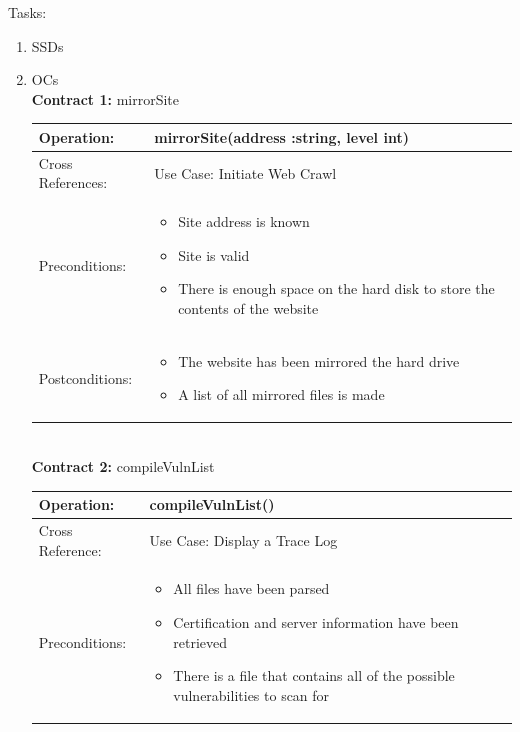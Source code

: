 \documentclass{article}
\begin{document}
\fancyhf{}
\rhead{\today}

{\large Tasks:}
\begin{enumerate}

\item SSDs 

\newpage

\item OCs\\

{\large \bf Contract 1:} mirrorSite \\[.5cm]
\begin{tabular}{|p{} | p{}|}
\hline
Operation: & mirrorSite(address :string, level int) \\ \hline
Cross References: & Use Case: Initiate Web Crawl\\ \hline
Preconditions: &
\begin{itemize}
	\item Site address is known
	\item Site is valid
	\item There is enough space on the hard disk to store the contents of the website
\end{itemize}\\ \hline

Postconditions: &
\begin{itemize}
	\item The website has been mirrored the hard drive
	\item A list of all mirrored files is made
\end{itemize}\\ \hline
\end{tabular} \\[1cm]

{\large \bf Contract 2:} compileVulnList\\[.5cm]
\begin{tabular}{|p{} | p{}|}
\hline
Operation: & compileVulnList() \\ \hline
Cross Reference: & Use Case: Display a Trace Log \\ \hline
Preconditions: & 
\begin{itemize}	
	\item All files have been parsed
	\item Certification and server information have been retrieved
	\item There is a file that contains all of the possible vulnerabilities to scan for
\end{itemize} \\ \hline


\end{tabular}
\end{enumerate}
\end{document}
